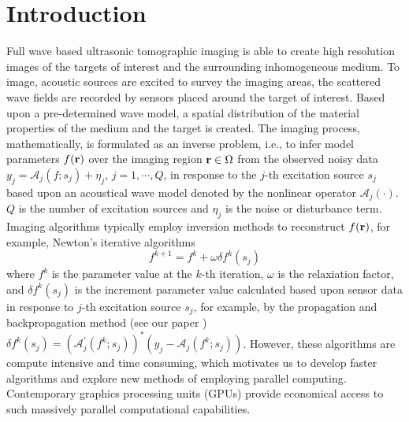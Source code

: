 \documentclass{sig-alternate}
\begin{document}


\pagebreak
\section{Introduction}
Full wave based ultrasonic tomographic imaging is able to create high resolution images of the targets of interest and the surrounding inhomogeneous medium. %
To image, acoustic sources are excited to survey the imaging areas, the scattered wave fields are recorded by sensors placed around the target of interest. Based upon a pre-determined wave model, a spatial distribution of the material properties of the medium and the target is created. The imaging process, mathematically, is formulated as an inverse problem, i.e.,
to infer model parameters $f({\bf r})$ over the imaging region ${\bf r} \in \Omega$ from the observed noisy data $y_j = {\mathcal{A}}_j(f; s_j) + {\eta}_j$, $j=1, \cdots, Q$,
in response to the $j$-th excitation source $s_j$ based upon an acoustical wave model denoted by the nonlinear operator $\mathcal{A}_j(\cdot)$.
$Q$ is the number of excitation sources and ${\eta}_j$ is the noise or disturbance term. Imaging algorithms typically employ inversion methods to reconstruct $f({\bf r})$, for example, Newton's iterative algorithms~\cite{Dong13,RoyJovanovicHormatiParhizkarVetterli}
\begin{equation}
f^{k+1} = f^k + \omega \delta f^k(s_j) \label{fkplus1}
\end{equation}
where $f^k$ is the parameter value at the $k$-th iteration, $\omega$ is the relaxiation factor, and $\delta f^k(s_j)$ is the increment parameter value calculated based upon sensor data in response to $j$-th excitation source $s_j$, for example, by the propagation and backpropagation method (see our paper \cite{Dong13}) $\delta f^k(s_j) =
\left({\mathcal{A}}^\prime_j(f^k; s_j)\right)^*(y_j - {\mathcal{A}}_j(f^k; s_j))$.
However, these algorithms are compute intensive and time consuming, which motivates us to develop faster algorithms and explore new methods of employing parallel computing. Contemporary graphics processing units (GPUs) provide economical access to such massively parallel computational capabilities.
\end{document}
